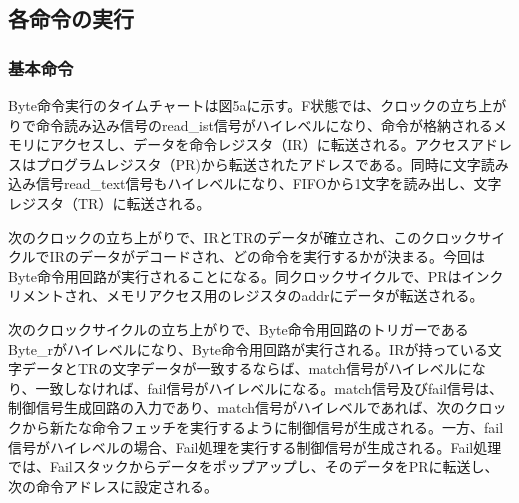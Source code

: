 \documentclass[submit,techrep]{ipsj}
\begin{document}

\subsection{各命令の実行}

\subsubsection{基本命令}

Byte命令実行のタイムチャートは図5aに示す。F状態では、クロックの立ち上がりで命令読み込み信号のread\_ist信号がハイレベルになり、命令が格納されるメモリにアクセスし、データを命令レジスタ（IR）に転送される。アクセスアドレスはプログラムレジスタ（PR)から転送されたアドレスである。同時に文字読み込み信号read\_text信号もハイレベルになり、FIFOから1文字を読み出し、文字レジスタ（TR）に転送される。

次のクロックの立ち上がりで、IRとTRのデータが確立され、このクロックサイクルでIRのデータがデコードされ、どの命令を実行するかが決まる。今回はByte命令用回路が実行されることになる。同クロックサイクルで、PRはインクリメントされ、メモリアクセス用のレジスタのaddrにデータが転送される。

次のクロックサイクルの立ち上がりで、Byte命令用回路のトリガーであるByte\_rがハイレベルになり、Byte命令用回路が実行される。IRが持っている文字データとTRの文字データが一致するならば、match信号がハイレベルになり、一致しなければ、fail信号がハイレベルになる。match信号及びfail信号は、制御信号生成回路の入力であり、match信号がハイレベルであれば、次のクロックから新たな命令フェッチを実行するように制御信号が生成される。一方、fail信号がハイレベルの場合、Fail処理を実行する制御信号が生成される。Fail処理では、Failスタックからデータをポップアップし、そのデータをPRに転送し、次の命令アドレスに設定される。
\end{document}
